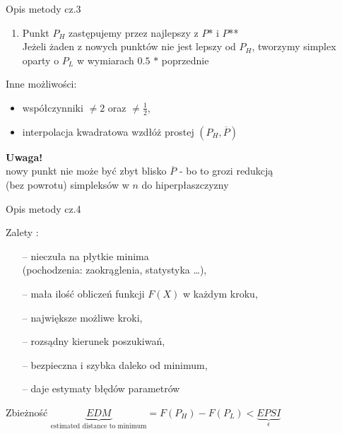   \begin{frame}{Opis metody cz.3}

	\begin{enumerate}
		\setcounter{enumi}{\value{saveenumi}}
		\item Punkt $P_H$ zastępujemy przez najlepszy z $P$* i $P$**
		\smallskip
		\\Jeżeli żaden z nowych punktów nie jest lepszy od $P_H$, tworzymy simplex oparty o $P_L$ w wymiarach $0.5$ $*$ poprzednie
	\end{enumerate}
	Inne możliwości:
	\begin{itemize}
		\item współczynniki $\neq 2$ oraz $\neq \frac{1}{2}$,
		\item interpolacja kwadratowa wzdłóż prostej $(P_H,\overline{P})$
	\end{itemize}
	\begin{block}{}
	  	\textbf{Uwaga!}
 	  	\\nowy punkt nie może być zbyt blisko $\overline{P}$ - bo to grozi redukcją
 	  	\\(bez powrotu) simpleksów w $n$ do hiperpłaszczyzny
    \end{block}

  \end{frame}

  \begin{frame}{Opis metody cz.4}

	\begin{block}{Zalety :}
	  	\begin{itemize}
	  		\item[--] nieczuła na płytkie minima
	  		\\(pochodzenia: zaokrąglenia, statystyka \ldots),
	  		\item[--] mała ilość obliczeń funkcji $F(X)$ w każdym kroku,
	  		\item[--] największe możliwe kroki,
	  		\item[--] rozsądny kierunek poszukiwań,
	  		\item[--] bezpieczna i szybka daleko od minimum,
	  		\item[--] daje estymaty błędów parametrów
	  	\end{itemize}
    \end{block}
    \begin{block}{Zbieżność}
	  	$\underbrace{EDM}_{ \text{estimated distance to minimum}} = F(P_H) - F(P_L) < \underbrace{EPSI}_{\epsilon}$
    \end{block}

  \end{frame}

